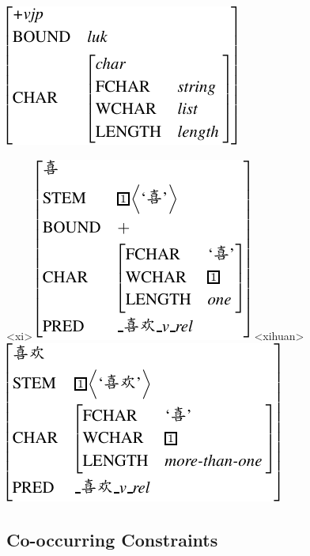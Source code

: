 \documentclass[11pt]{article}
\begin{document}
{\small 
\ex{}
\vspace{-10pt}
\newline
\includegraphics[scale=.8]{pdf/vjp.pdf}
\xe}
\vspace{-20pt}



{\small 
{}
\a<xi>
\vspace{-10pt}
\newline
\includegraphics[scale=.8]{pdf/xi.pdf}
\a<xihuan>
\vspace{-10pt}
\newline
\includegraphics[scale=.8]{pdf/xihuan.pdf}
\xe}
\vspace{-20pt}





\subsection{Co-occurring Constraints}
\label{ssec:cooccurring}
\end{document}
